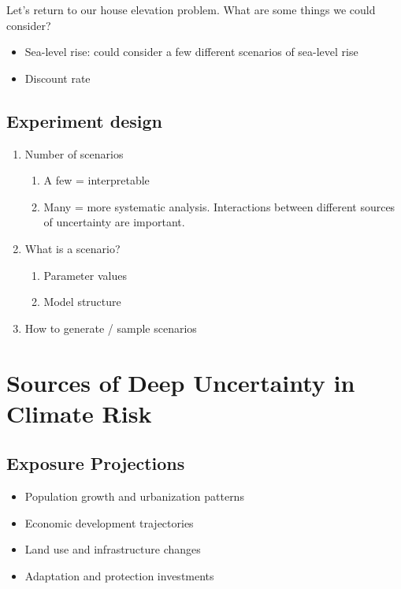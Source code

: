 \documentclass[
  letterpaper,
  DIV=11,
  numbers=noendperiod]{scrreprt}
\providecommand{\tightlist}{%
  \setlength{\itemsep}{0pt}\setlength{\parskip}{0pt}}
\begin{document}
Let's return to our house elevation problem. What are some things we
could consider?

\begin{itemize}
\tightlist
\item
  Sea-level rise: could consider a few different scenarios of sea-level
  rise
\item
  Discount rate
\end{itemize}

\subsection{Experiment design}\label{experiment-design}

\begin{enumerate}
\def\labelenumi{\arabic{enumi}.}
\tightlist
\item
  Number of scenarios

  \begin{enumerate}
  \def\labelenumii{\arabic{enumii}.}
  \tightlist
  \item
    A few = interpretable
  \item
    Many = more systematic analysis. Interactions between different
    sources of uncertainty are important.
  \end{enumerate}
\item
  What is a scenario?

  \begin{enumerate}
  \def\labelenumii{\arabic{enumii}.}
  \tightlist
  \item
    Parameter values
  \item
    Model structure
  \end{enumerate}
\item
  How to generate / sample scenarios
\end{enumerate}

\section{Sources of Deep Uncertainty in Climate
Risk}\label{sources-of-deep-uncertainty-in-climate-risk}

\subsection{Exposure Projections}\label{exposure-projections}

\begin{itemize}
\tightlist
\item
  Population growth and urbanization patterns
\item
  Economic development trajectories\\
\item
  Land use and infrastructure changes
\item
  Adaptation and protection investments
\end{itemize}
\end{document}
